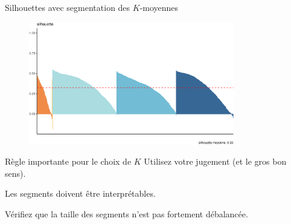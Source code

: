 \documentclass[
  ignorenonframetext,
]{beamer}
\begin{document}
\begin{frame}{Silhouettes avec segmentation des \(K\)-moyennes}
\protect\hypertarget{silhouettes-avec-segmentation-des-k-moyennes}{}
\begin{figure}

{\centering \includegraphics[width=0.8\textwidth,height=\textheight]{MATH60602-diapos11_files/figure-beamer/unnamed-chunk-19-1.pdf}

}

\end{figure}
\end{frame}

\begin{frame}{Règle importante pour le choix de \(K\)}
\protect\hypertarget{ruxe8gle-importante-pour-le-choix-de-k}{}
Utilisez votre jugement (et le gros bon sens).

Les segments doivent être interprétables.

Vérifiez que la taille des segments n'est pas fortement débalancée.
\end{frame}
\end{document}
